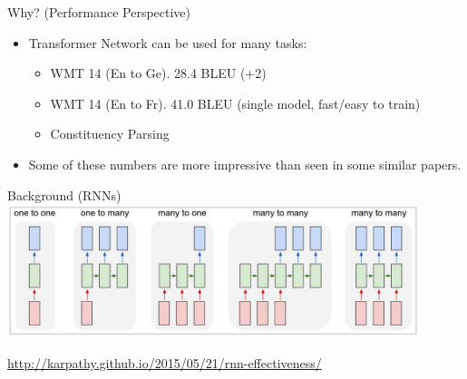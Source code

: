 \documentclass{beamer}
\begin{document}
\begin{frame}{Why? (Performance Perspective)}{}
\begin{itemize}
\item Transformer Network can be used for many tasks:
\begin{itemize}
\item WMT 14 (En to Ge). 28.4 BLEU (+2)
\item WMT 14 (En to Fr). 41.0 BLEU (single model, fast/easy to train)
\item Constituency Parsing
\end{itemize}

\item[] Some of these numbers are more impressive than seen in some similar papers.

\end{itemize}
\end{frame}
%

\begin{frame}{Background (RNNs)}{}
\centering
\includegraphics[width=0.9\textwidth]{img/karpathy.png}

\hfill

\url{http://karpathy.github.io/2015/05/21/rnn-effectiveness/}
\end{frame}
%
\end{document}

